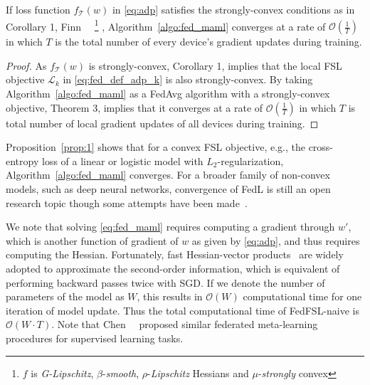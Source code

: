 \begin{prop}
\label{prop:1}
If loss function $f_{\mathcal{T}}(w)$ in \eqref{eq:adp} satisfies
the strongly-convex conditions as in Corollary 1, Finn~\etal~\cite{finn2019online}
\footnote{ $f$ is \textit{G-Lipschitz}, $\beta$-\textit{smooth}, $\rho$-\textit{Lipschitz} Hessians and $\mu$-\textit{strongly} convex}
,  Algorithm~\ref{algo:fed_maml} converges at a rate of  $\mathcal{O}(\frac{1}{T})$ in which $T$ is the total number of every device's gradient updates during training.
\end{prop}
\begin{proof}
As $f_{\mathcal{T}}(w)$ is strongly-convex, 
Corollary 1, \cite{finn2019online} implies that the local FSL objective $\mathcal{L}_k$ in \eqref{eq:fed_def_adp_k} is also strongly-convex. By taking Algorithm~\ref{algo:fed_maml} as a FedAvg algorithm with a strongly-convex objective, Theorem 3, \cite{li2019convergence} implies that it converges at a rate of  $\mathcal{O}(\frac{1}{T})$ in which $T$ is total number of local gradient updates of all devices during training.
\end{proof}

Proposition~\ref{prop:1} shows that for a convex FSL objective,
e.g., the cross-entropy loss of a linear or logistic model with $L_2$-regularization, Algorithm~\ref{algo:fed_maml} converges.
For a broader family of non-convex models, such as deep neural networks, convergence of FedL is still an open research topic though 
some attempts have been made~\cite{smith2017cocoa, li2018federated}.


We note that solving \eqref{eq:fed_maml} requires computing a gradient through $w'$, which is another function of gradient of $w$ as given by \eqref{eq:adp}, and thus requires computing the Hessian. Fortunately, fast Hessian-vector products~\cite{ghorbani2019investigation} are widely adopted to approximate the second-order information, which is equivalent of performing backward passes twice with SGD.
If we denote the number of parameters of the model as $W$, this results in $\mathcal{O}(W)$ computational time for one iteration of model update. Thus the total computational time of FedFSL-naive is $\mathcal{O}(W\cdot T)$. Note that Chen~\etal~\cite{chen2018fedmeta}  proposed similar federated meta-learning procedures for supervised learning tasks.






